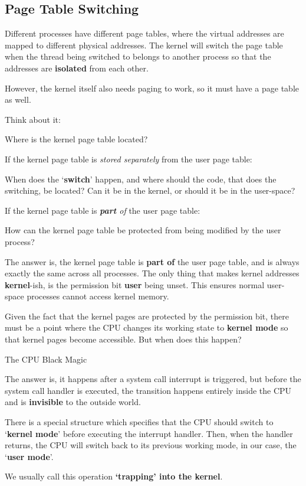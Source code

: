 \subsection{Page Table Switching}

Different processes have different page tables, where the virtual addresses are
mapped to different physical addresses. The kernel will switch the page table
when the thread being switched to belongs to another process so that the addresses
are \textbf{isolated} from each other.

However, the kernel itself also needs paging to work, so it must have a page table
as well.

\begin{exercise*}{Think about it:}
    \item Where is the kernel page table located?
    \item If the kernel page table is \textit{stored separately} from the user page table:

    When does the `\textbf{switch}' happen, and where should the code, that
    does the switching, be located? Can it be in the kernel, or should it be
    in the user-space?

    \item If the kernel page table is \textit{\textbf{part} of} the user page table:

    How can the kernel page table be protected from being modified by the user
    process?
\end{exercise*}

The answer is, the kernel page table is \textbf{part of} the user page table, and
is always exactly the same across all processes. The only thing that makes kernel
addresses \textbf{kernel}-ish, is the permission bit \textbf{user} being unset.
This ensures normal user-space processes cannot access kernel memory.

Given the fact that the kernel pages are protected by the permission bit, there must
be a point where the CPU changes its working state to \textbf{kernel mode} so that
kernel pages become accessible. But when does this happen?

\begin{note*}{The CPU Black Magic}
    \item The answer is, it happens after a system call interrupt is triggered,
    but before the system call handler is executed, the transition happens
    entirely inside the CPU and is \textbf{invisible} to the outside world.

    \item There is a special structure which specifies that the CPU should
    switch to `\textbf{kernel mode}' before executing the interrupt handler.
    Then, when the handler returns, the CPU will switch back to its previous
    working mode, in our case, the `\textbf{user mode}'.

    \item We usually call this operation \textbf{`trapping' into the kernel}.
\end{note*}

